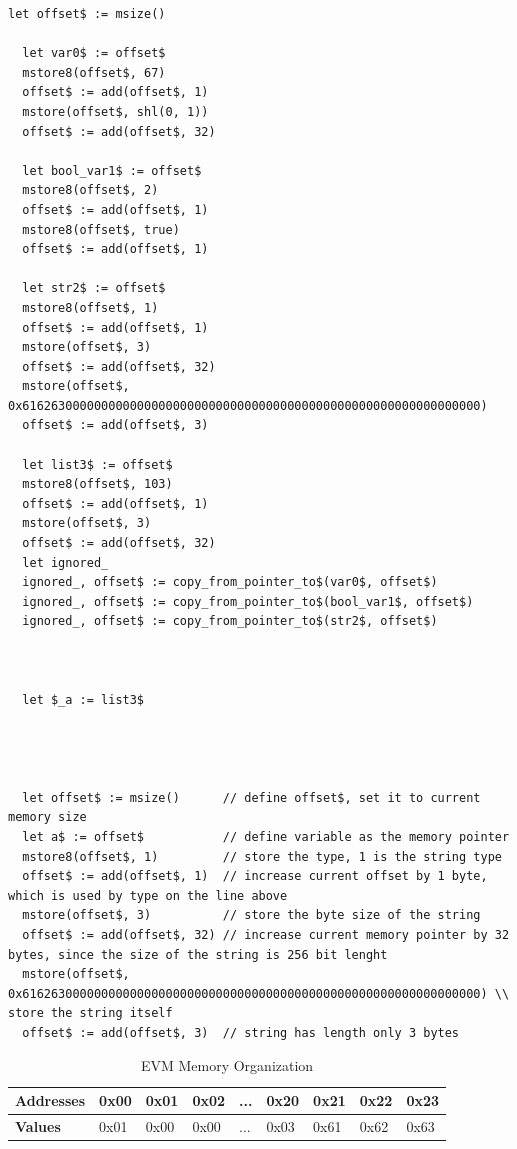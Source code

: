 \begin{lstlisting}[caption={Generated yul code for string case}, language=yul]
  let offset$ := msize()
  
  let var0$ := offset$
  mstore8(offset$, 67)
  offset$ := add(offset$, 1)
  mstore(offset$, shl(0, 1))
  offset$ := add(offset$, 32)
  
  let bool_var1$ := offset$
  mstore8(offset$, 2)
  offset$ := add(offset$, 1)
  mstore8(offset$, true)
  offset$ := add(offset$, 1)

  let str2$ := offset$
  mstore8(offset$, 1)
  offset$ := add(offset$, 1)
  mstore(offset$, 3)
  offset$ := add(offset$, 32)
  mstore(offset$, 0x6162630000000000000000000000000000000000000000000000000000000000)
  offset$ := add(offset$, 3)

  let list3$ := offset$
  mstore8(offset$, 103)
  offset$ := add(offset$, 1)
  mstore(offset$, 3)
  offset$ := add(offset$, 32)
  let ignored_
  ignored_, offset$ := copy_from_pointer_to$(var0$, offset$)
  ignored_, offset$ := copy_from_pointer_to$(bool_var1$, offset$)
  ignored_, offset$ := copy_from_pointer_to$(str2$, offset$)



  let $_a := list3$



  
  let offset$ := msize()      // define offset$, set it to current memory size 
  let a$ := offset$           // define variable as the memory pointer
  mstore8(offset$, 1)         // store the type, 1 is the string type
  offset$ := add(offset$, 1)  // increase current offset by 1 byte, which is used by type on the line above
  mstore(offset$, 3)          // store the byte size of the string
  offset$ := add(offset$, 32) // increase current memory pointer by 32 bytes, since the size of the string is 256 bit lenght
  mstore(offset$, 0x6162630000000000000000000000000000000000000000000000000000000000) \\ store the string itself
  offset$ := add(offset$, 3)  // string has length only 3 bytes
\end{lstlisting}
  
\begin{table}[h!]
  \centering
  \renewcommand{\arraystretch}{1.2} %
  \begin{tabular}{|>{\centering\arraybackslash}m{2cm}|>{\centering\arraybackslash}m{1cm}|>{\centering\arraybackslash}m{1cm}|>{\centering\arraybackslash}m{1cm}|>{\centering\arraybackslash}m{0.75cm}|>{\centering\arraybackslash}m{1cm}|>{\centering\arraybackslash}m{1cm}|>{\centering\arraybackslash}m{1cm}|>{\centering\arraybackslash}m{1cm}|}
  \hline
  \textbf{Addresses} & 0x00 & 0x01 & 0x02 & ... & 0x20 & 0x21 & 0x22 & 0x23 \\ \hline
  \textbf{Values}    & 0x01 & 0x00 & 0x00 & ... & 0x03 & 0x61 & 0x62 & 0x63 \\ \hline
  \end{tabular}
  \caption{EVM Memory Organization}
  \label{tab:evm_memory}
  \end{table}

